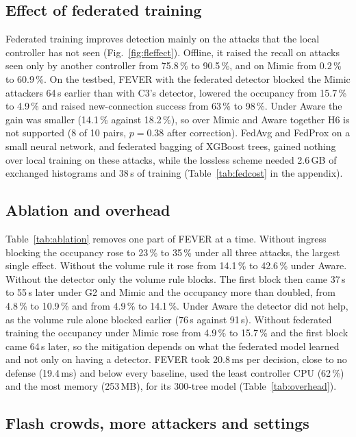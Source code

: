\documentclass[conference]{IEEEtran}
\begin{document}
\subsection{Effect of federated training}

Federated training improves detection mainly on the attacks that the local controller has not seen
(Fig.~\ref{fig:fleffect}). Offline, it raised the recall on attacks seen only by another controller from
75.8\,\% to 90.5\,\%, and on Mimic from 0.2\,\% to 60.9\,\%. On the testbed, FEVER with the federated
detector blocked the Mimic attackers 64\,s earlier than with C3's detector, lowered the occupancy from
15.7\,\% to 4.9\,\% and raised new-connection success from 63\,\% to 98\,\%. Under Aware the gain was
smaller (14.1\,\% against 18.2\,\%), so over Mimic and Aware together H6 is not supported (8 of 10 pairs,
$p = 0.38$ after correction). FedAvg and FedProx on a small neural network, and federated bagging of
XGBoost trees, gained nothing over local training on these attacks, while the lossless scheme needed
2.6\,GB of exchanged histograms and 38\,s of training (Table~\ref{tab:fedcost} in the appendix).

\subsection{Ablation and overhead}

Table~\ref{tab:ablation} removes one part of FEVER at a time. Without ingress blocking the occupancy rose
to 23\,\% to 35\,\% under all three attacks, the largest single effect. Without the volume rule it rose
from 14.1\,\% to 42.6\,\% under Aware. Without the detector only the volume rule blocks. The first block then came
37\,s to 55\,s later under G2 and Mimic and the occupancy more than doubled, from 4.8\,\% to 10.9\,\%
and from 4.9\,\% to 14.1\,\%. Under Aware the detector did not help, as the volume rule alone
blocked earlier (76\,s against 91\,s). Without federated training the occupancy under Mimic rose from
4.9\,\% to 15.7\,\% and the first block came 64\,s later, so the mitigation depends on what the
federated model learned and not only on having a detector. FEVER took 20.8\,ms per decision, close to no defense (19.4\,ms) and
below every baseline, used the least controller CPU (62\,\%) and the most memory (253\,MB), for its
300-tree model (Table~\ref{tab:overhead}).

\subsection{Flash crowds, more attackers and settings}
\end{document}
